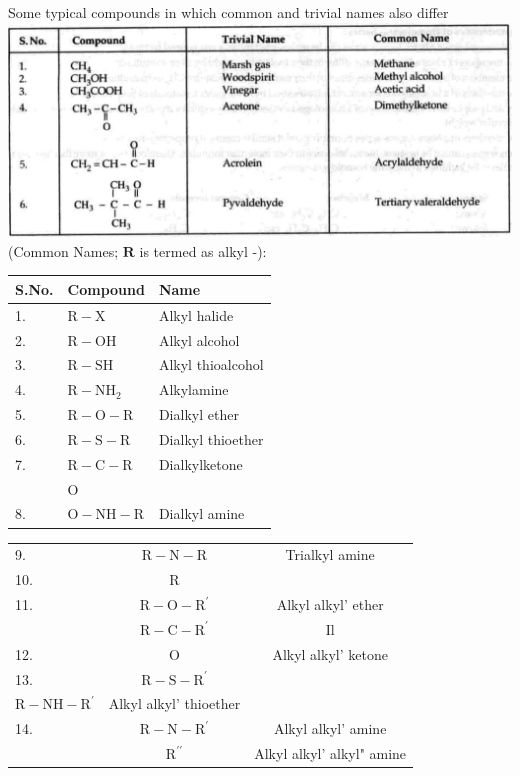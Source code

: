 \documentclass[10pt]{article}
\begin{document}
Some typical compounds in which common and trivial names also differ\\
\includegraphics[max width=\textwidth, center]{2025_01_28_8470952b98110cec3aabg-012}\\
(Common Names; $\mathbf{R}$ is termed as alkyl -):

\begin{center}
\begin{tabular}{|l|l|l|}
\hline
S.No. & Compound & Name \\
\hline
1. & $\mathrm{R}-\mathrm{X}$ & Alkyl halide \\
2. & $\mathrm{R}-\mathrm{OH}$ & Alkyl alcohol \\
3. & $\mathrm{R}-\mathrm{SH}$ & Alkyl thioalcohol \\
4. & $\mathrm{R}-\mathrm{NH}_{2}$ & Alkylamine \\
5. & $\mathrm{R}-\mathrm{O}-\mathrm{R}$ & Dialkyl ether \\
6. & $\mathrm{R}-\mathrm{S}-\mathrm{R}$ & Dialkyl thioether \\
7. & $\mathrm{R}-\mathrm{C}-\mathrm{R}$ & Dialkylketone \\
 & O &  \\
8. & $\mathrm{O}-\mathrm{NH}-\mathrm{R}$ & Dialkyl amine \\
\hline
\end{tabular}
\end{center}

\begin{center}
\begin{tabular}{|l|c|c|}
\hline
9. & $\mathrm{R}-\mathrm{N}-\mathrm{R}$ & Trialkyl amine \\
10. & R &  \\
11. & $\mathrm{R}-\mathrm{O}-\mathrm{R}^{\prime}$ & Alkyl alkyl' ether \\
 & $\mathrm{R}-\mathrm{C}-\mathrm{R}^{\prime}$ & Il \\
12. & O & Alkyl alkyl' ketone \\
13. & $\mathrm{R}-\mathrm{S}-\mathrm{R}^{\prime}$ &  \\
$\mathrm{R}-\mathrm{NH}-\mathrm{R}^{\prime}$ & Alkyl alkyl' thioether &  \\
14. & $\mathrm{R}-\mathrm{N}-\mathrm{R}^{\prime}$ & Alkyl alkyl' amine \\
 & $\mathrm{R}^{\prime \prime}$ & Alkyl alkyl' alkyl" amine \\
\end{tabular}
\end{center}
\end{document}
